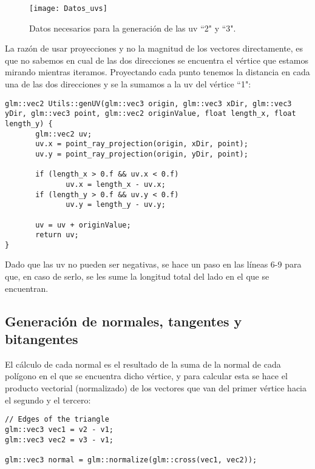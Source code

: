 \begin{figure}[H]
    \centering
    \texttt{[image: Datos\_uvs]}
    \caption{Datos necesarios para la generación de las uv ``2" y ``3".}
    \label{fig:datos_uvs}
\end{figure}

La razón de usar proyecciones y no la magnitud de los vectores directamente, es que no sabemos en cual de las dos direcciones se encuentra el vértice que estamos mirando mientras iteramos. Proyectando cada punto tenemos la distancia en cada una de las dos direcciones y se la sumamos a la uv del vértice ``1":

\begin{lstlisting}
glm::vec2 Utils::genUV(glm::vec3 origin, glm::vec3 xDir, glm::vec3 yDir, glm::vec3 point, glm::vec2 originValue, float length_x, float length_y) {
       glm::vec2 uv;
       uv.x = point_ray_projection(origin, xDir, point);
       uv.y = point_ray_projection(origin, yDir, point);

       if (length_x > 0.f && uv.x < 0.f)
              uv.x = length_x - uv.x;
       if (length_y > 0.f && uv.y < 0.f)
              uv.y = length_y - uv.y;

       uv = uv + originValue;
       return uv;
}
\end{lstlisting}

Dado que las uv no pueden ser negativas, se hace un paso en las líneas 6-9 para que, en caso de serlo, se les sume la longitud total del lado en el que se encuentran.

\subsection{Generación de normales, tangentes y bitangentes}
El cálculo de cada normal es el resultado de la suma de la normal de cada polígono en el que se encuentra dicho vértice, y para calcular esta se hace el producto vectorial (normalizado) de los vectores que van del primer vértice hacia el segundo y el tercero:

\begin{lstlisting}
// Edges of the triangle
glm::vec3 vec1 = v2 - v1;
glm::vec3 vec2 = v3 - v1;

glm::vec3 normal = glm::normalize(glm::cross(vec1, vec2));
\end{lstlisting}

